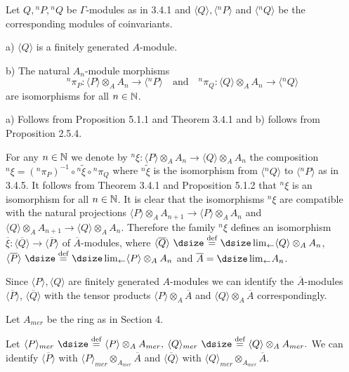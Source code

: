   Let  $Q, {}^nP, {}^nQ$  be $\Gamma$-modules as in 3.4.1
and  $\langle Q\rangle, \langle {}^nP\rangle$ and $\langle {}^nQ\rangle$  be
the  corresponding modules of coinvariants.

  a)  $\langle Q\rangle$  is a finitely generated
$A$-module.

b)  The natural $A_n$-module morphisms
$$
{}^n\pi_P: \langle P\rangle \otimes_A A_n \to \langle {}^nP\rangle\quad
\text{and}\quad  {}^n\pi_Q: \langle Q\rangle \otimes_A A_n \to
\langle {}^nQ\rangle
$$
are isomorphisms for all $n \in {\Bbb N}$.
\endproclaim

  a) Follows from Proposition 5.1.1 and Theorem 3.4.1
and b) follows from Proposition 2.5.4.
\enddemo

  For any  $n \in {\Bbb N}$  we denote by
${}^n\xi: \langle P\rangle \otimes_A A_n \to \langle Q\rangle \otimes_A A_n$
the composition  ${}^n\xi = ({}^n\pi_P)^{-1} \circ {}^n \widetilde{\xi} \circ
{}^n\pi_Q$  where  ${}^n\widetilde{\xi}$  is the isomorphism from
$\langle {}^nQ\rangle$  to $\langle {}^nP\rangle$  as in 3.4.5.  It follows
from Theorem 3.4.1 and Proposition 5.1.2 that  ${}^n\xi$  is an isomorphism
for all $n \in {\Bbb N}$.  It is clear that the isomorphisms ${}^n\xi$  are
compatible with the natural projections $\langle P\rangle \otimes_A
A_{n+1} \to \langle P\rangle \otimes_A A_n$ and  $\langle Q\rangle \otimes_A
A_{n+1} \to \langle Q\rangle \otimes_A A_n$.  Therefore the family
${}^n\xi$  defines an isomorphism $\overline{\xi}:
\langle \overline{Q}\rangle \to \langle \overline{P}\rangle$ of
$\overline{A}$-modules, where  $\langle \overline{Q}\rangle\
{\dsize\buildrel{\text{def}}\over =}\
{\dsize\lim_{\leftarrow}} \langle Q\rangle \otimes_A A_n$,
$\langle \overline{P}\rangle\ {\dsize\buildrel{\text{def}}\over =}\
{\dsize\lim_{\leftarrow}} \langle P\rangle \otimes_A A_n$ and
$\overline{A} = {\dsize\lim_{\leftarrow}} A_n$.

Since $\langle P\rangle, \langle Q\rangle$  are finitely generated $A$-modules
we can identify the $\overline{A}$-modules  $\langle \overline{P}\rangle$,
$\langle \overline{Q}\rangle$ with the tensor products $\langle P\rangle
\otimes_A \overline{A}$ and $\langle Q\rangle \otimes_A \overline{A}$
correspondingly.

Let  $A_{mer}$  be the ring as in Section 4.

  Let  $\langle P\rangle_{mer}\
{\dsize\buildrel{\text{def}}\over =}\
\langle P\rangle \otimes_A A_{mer},$ $\langle Q\rangle_{mer}\
{\dsize\buildrel{\text{def}}\over =}\
\langle Q\rangle \otimes_A A_{mer}.$   We can identify $\langle
\overline{P}\rangle$
with $\langle P\rangle_{mer} \otimes_{A_{mer}} \overline{A}$  and
$\langle \overline{Q}\rangle$ with $\langle Q\rangle_{mer} \otimes_{A_{mer}}
\overline{A}$.

